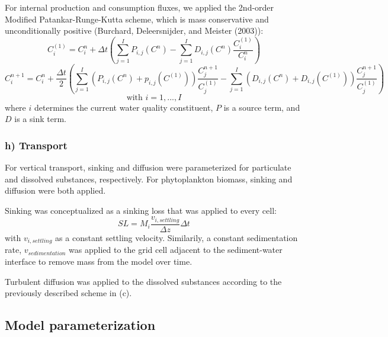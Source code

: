 \documentclass[
  letterpaper,
  DIV=11,
  numbers=noendperiod]{scrartcl}
\begin{document}
For internal production and consumption fluxes, we applied the 2nd-order
Modified Patankar-Runge-Kutta scheme, which is mass conservative and
unconditionally positive (Burchard, Deleersnijder, and Meister (2003)):
\[
C_i^{(1)}=C_i^n + \Delta t(\sum_{j=1}^I P_{i,j}(C^n) - \sum_{j=1}^I D_{i,j}(C^n) \frac{C_i^{(1)}}{C_i^n})
\] \[
C_i^{n+1} = C_i^n + \frac{\Delta t}{2} (\sum_{j=1}^I (P_{i,j}(C^n) + p_{i,j}(C^{(1)})) \frac{C_j^{n+1}}{C_j^{(1)}} - \sum_{j=1}^I (D_{i,j}(C^n) + D_{i,j}(C^{(1)})) \frac{C_j^{n+1}}{C_j^{(1)}})
\] \[
\text{with } i = 1, ..., I
\] where \(i\) determines the current water quality constituent, \(P\)
is a source term, and \(D\) is a sink term.

\hypertarget{h-transport}{%
\subsubsection{h) Transport}\label{h-transport}}

For vertical transport, sinking and diffusion were parameterized for
particulate and dissolved substances, respectively. For phytoplankton
biomass, sinking and diffusion were both applied.

Sinking was conceptualized as a sinking loss that was applied to every
cell: \[
SL = M_i \frac{v_{i,settling}}{\Delta z} \Delta t
\] with \(v_{i,settling}\) as a constant settling velocity. Similarily,
a constant sedimentation rate, \(v_{sedimentation}\) was applied to the
grid cell adjacent to the sediment-water interface to remove mass from
the model over time.

Turbulent diffusion was applied to the dissolved substances according to
the previously described scheme in (c).

\hypertarget{model-parameterization}{%
\subsection{Model parameterization}\label{model-parameterization}}
\end{document}
